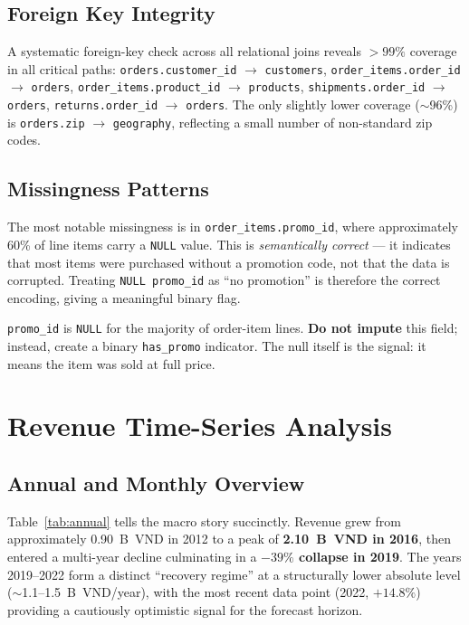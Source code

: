 \documentclass{article}
\begin{document}
\subsection{Foreign Key Integrity}

A systematic foreign-key check across all relational joins reveals
$>99\%$ coverage in all critical paths:
\texttt{orders.customer\_id} $\to$ \texttt{customers},
\texttt{order\_items.order\_id} $\to$ \texttt{orders},
\texttt{order\_items.product\_id} $\to$ \texttt{products},
\texttt{shipments.order\_id} $\to$ \texttt{orders},
\texttt{returns.order\_id} $\to$ \texttt{orders}.
The only slightly lower coverage ($\sim$96\%) is
\texttt{orders.zip} $\to$ \texttt{geography}, reflecting a small number of
non-standard zip codes.

\subsection{Missingness Patterns}

The most notable missingness is in \texttt{order\_items.promo\_id}, where
approximately 60\% of line items carry a \texttt{NULL} value.
This is \emph{semantically correct} — it indicates that most items were purchased
without a promotion code, not that the data is corrupted.
Treating \texttt{NULL promo\_id} as ``no promotion'' is therefore the correct
encoding, giving a meaningful binary flag.

\begin{warningbox}
\texttt{promo\_id} is \texttt{NULL} for the majority of order-item lines.
\textbf{Do not impute} this field; instead, create a binary
\texttt{has\_promo} indicator.
The null itself is the signal: it means the item was sold at full price.
\end{warningbox}

\section{Revenue Time-Series Analysis}
\label{sec:ts}

\subsection{Annual and Monthly Overview}

Table~\ref{tab:annual} tells the macro story succinctly.
Revenue grew from approximately 0.90~B~VND in 2012 to a peak of
\textbf{2.10~B~VND in 2016}, then entered a multi-year decline culminating in
a \textbf{$-39\%$ collapse in 2019}.
The years 2019--2022 form a distinct ``recovery regime'' at a structurally lower
absolute level ($\sim$1.1--1.5~B~VND/year), with the most recent data point
(2022, $+14.8\%$) providing a cautiously optimistic signal for the forecast
horizon.
\end{document}
